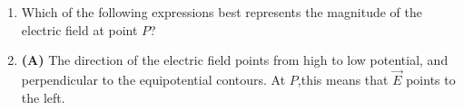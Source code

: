\documentclass{../oss-handout}
\begin{document}
\begin{enumerate}[leftmargin=17pt]
\item Which of the following expressions best represents the magnitude of
  the electric field at point $P$?

\item\textbf{(A)} The direction of the electric field points from high to low potential, and perpendicular
to the equipotential contours. At $P$,this means that $\vec E$ points to the left.


\end{enumerate}
\end{document}
